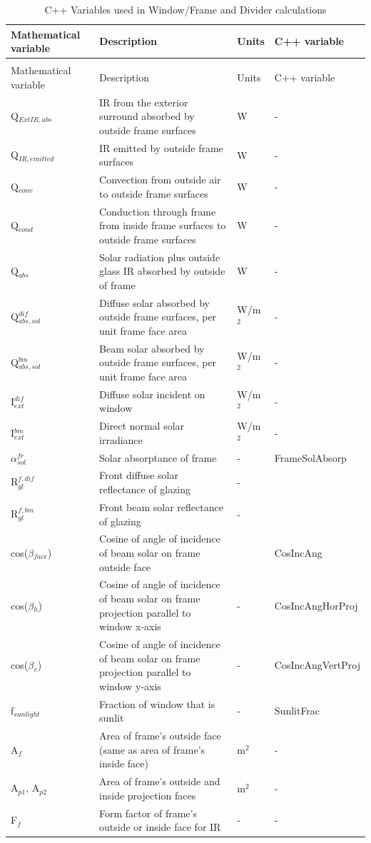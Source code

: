 \begin{longtable}[c]{p{1.0in}p{2.5in}p{1.0in}p{1.5in}}
\caption{C++ Variables used in Window/Frame and Divider calculations \label{table:c++-variables-used-in-windowframe}} \tabularnewline
\toprule
Mathematical variable & Description & Units & C++ variable \tabularnewline
\midrule
\endfirsthead

\caption[]{C++ Variables used in Window/Frame and Divider calculations} \tabularnewline
\toprule
Mathematical variable & Description & Units & C++ variable \tabularnewline
\midrule
\endhead

Q\(_{ExtIR,abs}\) & IR from the exterior surround absorbed by outside frame surfaces & W & - \tabularnewline
Q\(_{IR,emitted}\) & IR emitted by outside frame surfaces & W & - \tabularnewline
Q\(_{conv}\) & Convection from outside air to outside frame surfaces & W & - \tabularnewline
Q\(_{cond}\) & Conduction through frame from inside frame surfaces to outside frame surfaces & W & - \tabularnewline
Q\(_{abs}\) & Solar radiation plus outside glass IR absorbed by outside of frame & W & - \tabularnewline
Q\(^{dif}_{abs,sol}\) & Diffuse solar absorbed by outside frame surfaces, per unit frame face area & W/m\(^{2}\) & - \tabularnewline
Q\(^{bm}_{abs,sol}\) & Beam solar absorbed by outside frame surfaces, per unit frame face area & W/m\(^{2}\) & - \tabularnewline
I\(^{dif}_{ext}\) & Diffuse solar incident on window & W/m\(^{2}\) & - \tabularnewline
I\(^{bm}_{ext}\) & Direct normal solar irradiance & W/m\(^{2}\) & - \tabularnewline
$\alpha$\(^{fr}_{sol}\) & Solar absorptance of frame & - & FrameSolAbsorp \tabularnewline
R\(_{gl}^{f,dif}\) & Front diffuse solar reflectance of glazing & - & ~ \tabularnewline
R\(_{gl}^{f,bm}\) & Front beam solar reflectance of glazing & - & ~ \tabularnewline
cos($\beta$\(_{face}\)) & Cosine of angle of incidence of beam solar on frame outside face & ~ & CosIncAng \tabularnewline
cos($\beta$\(_{h}\)) & Cosine of angle of incidence of beam solar on frame projection parallel to window x-axis & - & CosIncAngHorProj \tabularnewline
cos($\beta$\(_{v}\)) & Cosine of angle of incidence of beam solar on frame projection parallel to window y-axis & - & CosIncAngVertProj \tabularnewline
f\(_{sunlight}\) & Fraction of window that is sunlit & - & SunlitFrac \tabularnewline
A\(_{f}\) & Area of frame’s outside face (same as area of frame’s inside face) & m\(^{2}\) & - \tabularnewline
A\(_{p1}\), A\(_{p2}\) & Area of frame’s outside and inside projection faces & m\(^{2}\) & - \tabularnewline
F\(_{f}\) & Form factor of frame’s outside or inside face for IR & - & - \tabularnewline

\end{longtable}
